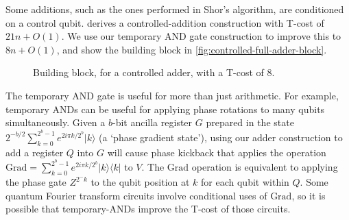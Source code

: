 \documentclass[twocolumn,longbibliography]{quantumarticle-customized}
\begin{document}
Some additions, such as the ones performed in Shor's algorithm, are conditioned on a control qubit.
\cite{Coreas2017} derives a controlled-addition construction with T-cost of $21n + O(1)$.
We use our temporary AND gate construction to improve this to $8n + O(1)$, and show the building block in \autoref{fig:controlled-full-adder-block}.

\begin{figure}
  \caption{
	Building block, for a controlled adder, with a T-cost of 8.
  }
  \label{fig:controlled-full-adder-block}
\end{figure}

The temporary AND gate is useful for more than just arithmetic.
For example, temporary ANDs can be useful for applying phase rotations to many qubits simultaneously.
Given a $b$-bit ancilla register $G$ prepared in the state $2^{-b/2} \sum_{k=0}^{2^b-1} e^{2 i \pi k / 2^b} |k\rangle$ (a `phase gradient state'), using our adder construction to add a register $Q$ into $G$ will cause phase kickback that applies the operation $\text{Grad} = \sum_{k=0}^{2^b-1} e^{2 i \pi k / 2^b} |k\rangle \langle k|$ to $V$.
The $\text{Grad}$ operation is equivalent to applying the phase gate $Z^{2^-k}$ to the qubit position at $k$ for each qubit within $Q$.
Some quantum Fourier transform circuits involve conditional uses of $\text{Grad}$, so it is possible that temporary-ANDs improve the T-cost of those circuits.
\end{document}

